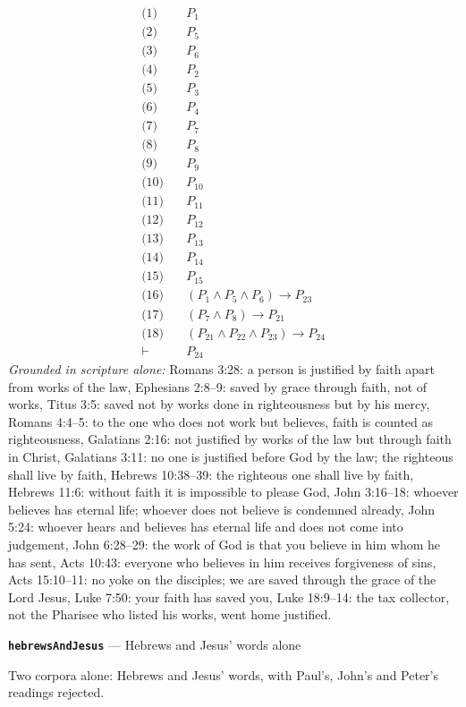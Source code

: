 \documentclass[11pt]{article}
\begin{document}
\begin{align*}
  \text{(1)} \quad & P_{1} \\
  \text{(2)} \quad & P_{5} \\
  \text{(3)} \quad & P_{6} \\
  \text{(4)} \quad & P_{2} \\
  \text{(5)} \quad & P_{3} \\
  \text{(6)} \quad & P_{4} \\
  \text{(7)} \quad & P_{7} \\
  \text{(8)} \quad & P_{8} \\
  \text{(9)} \quad & P_{9} \\
  \text{(10)} \quad & P_{10} \\
  \text{(11)} \quad & P_{11} \\
  \text{(12)} \quad & P_{12} \\
  \text{(13)} \quad & P_{13} \\
  \text{(14)} \quad & P_{14} \\
  \text{(15)} \quad & P_{15} \\
  \text{(16)} \quad & (P_{1} \land P_{5} \land P_{6}) \rightarrow P_{23} \\
  \text{(17)} \quad & (P_{7} \land P_{8}) \rightarrow P_{21} \\
  \text{(18)} \quad & (P_{21} \land P_{22} \land P_{23}) \rightarrow P_{24} \\
  \vdash \quad & P_{24}
\end{align*}
\emph{Grounded in scripture alone:} Romans 3:28: a person is justified by faith apart from works of the law, Ephesians 2:8–9: saved by grace through faith, not of works, Titus 3:5: saved not by works done in righteousness but by his mercy, Romans 4:4–5: to the one who does not work but believes, faith is counted as righteousness, Galatians 2:16: not justified by works of the law but through faith in Christ, Galatians 3:11: no one is justified before God by the law; the righteous shall live by faith, Hebrews 10:38–39: the righteous one shall live by faith, Hebrews 11:6: without faith it is impossible to please God, John 3:16–18: whoever believes has eternal life; whoever does not believe is condemned already, John 5:24: whoever hears and believes has eternal life and does not come into judgement, John 6:28–29: the work of God is that you believe in him whom he has sent, Acts 10:43: everyone who believes in him receives forgiveness of sins, Acts 15:10–11: no yoke on the disciples; we are saved through the grace of the Lord Jesus, Luke 7:50: your faith has saved you, Luke 18:9–14: the tax collector, not the Pharisee who listed his works, went home justified.
\par\medskip\noindent\textbf{\texttt{hebrews\allowbreak{}And\allowbreak{}Jesus}} --- Hebrews and Jesus' words alone\par\nobreak\noindent
Two corpora alone: Hebrews and Jesus' words, with Paul's, John's and Peter's readings rejected.
\end{document}
